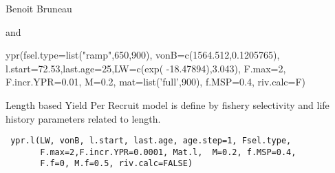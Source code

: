 \documentclass[a4paper]{book}
\begin{document}
%
\begin{Author}\relax
Benoit Bruneau
\end{Author}
%
\begin{SeeAlso}\relax
{} and   
\end{SeeAlso}
%
\begin{Examples}
\begin{ExampleCode}

ypr(fsel.type=list("ramp",650,900), vonB=c(1564.512,0.1205765), 
      l.start=72.53,last.age=25,LW=c(exp( -18.47894),3.043), F.max=2,
      F.incr.YPR=0.01, M=0.2, mat=list('full',900), f.MSP=0.4, riv.calc=F) 

\end{ExampleCode}
\end{Examples}
\newpage
{}
%
\begin{Description}\relax
Length based Yield Per Recruit model is define by fishery selectivity and life history parameters related to length. 


\end{Description}
%
\begin{Usage}
\begin{verbatim}
 ypr.l(LW, vonB, l.start, last.age, age.step=1, Fsel.type, 
       F.max=2,F.incr.YPR=0.0001, Mat.l,  M=0.2, f.MSP=0.4, 
       F.f=0, M.f=0.5, riv.calc=FALSE)

\end{verbatim}
\end{Usage}
%
\end{document}
